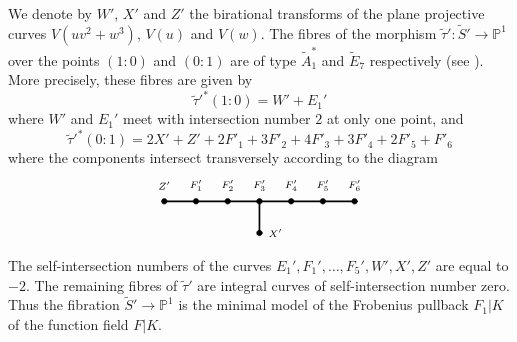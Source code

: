 \documentclass[12pt,reqno]{amsart}
\theoremstyle{definition}
\newcommand{\wt}{\widetilde}
\newcommand{\PP}{\mathbb{P}}
\begin{document}
We denote by $W'$, $X'$ and $Z'$ the birational transforms of the plane projective curves $V(uv^2 + w^3)$, $V(u)$ and $V(w)$.
The fibres of the morphism $\wt \tau' : \wt S' \to \PP^1$ over the points $(1:0)$ and $(0:1)$ are of type $\wt A_1^*$ and $\wt E_7$ respectively (see \cite[Theorem~4.1.4 and Corollary~4.3.22]{CDL23}).
More precisely, these fibres are given by
\[ \wt \tau'^* (1:0) = W' + E_1' \]
where $W'$ and $E_1'$ meet with intersection number $2$ at only one point, and
\[ \wt \tau'^*(0:1) = 2 X' + Z' + 2 F'_1 + 3 F'_2 + 4 F'_3 + 3 F'_4 + 2 F'_5 + F'_6  \]
where the components intersect transversely according to the diagram
\[
\begin{tikzpicture}[line cap=round,line join=round,x=0.8cm,y=0.8cm]
\draw [line width=1.2pt] (-7.,0.)-- (-1.,0.);
\draw [line width=1.2pt] (-4.,0.)-- (-4.,-1.);
\begin{scriptsize}
\draw [fill=black] (-7,0) circle (2pt);
\draw[color=black] (-7,0.5) node {$Z'$};    
\draw [fill=black] (-6,0) circle (2pt);
\draw[color=black] (-6,0.5) node {$F_1'$};
\draw [fill=black] (-5,0) circle (2pt);
\draw[color=black] (-5,0.5) node {$F_2'$};
\draw [fill=black] (-4,0) circle (2pt);
\draw[color=black] (-4,0.5) node {$F_3'$};
\draw [fill=black] (-4,-1.) circle (2pt);
\draw[color=black] (-4.5 + 1,-1) node {$X'$};
\draw [fill=black] (-3,0) circle (2pt);
\draw[color=black] (-3,0.5) node {$F_4'$};
\draw [fill=black] (-2.,0.) circle (2pt);
\draw[color=black] (-2.,.5) node {$F_5'$};
\draw [fill=black] (-1.,0.) circle (2pt);
\draw[color=black] (-1.,.5) node {$F_6'$};
\end{scriptsize}
\end{tikzpicture}
\]
The self-intersection numbers of the curves $E_1',F_1',\dots,F_5',W',X',Z'$ are equal to $-2$.
The remaining fibres of $\wt \tau'$ are integral curves of self-intersection number zero.
Thus the fibration $\wt S' \to \PP^1$ is the minimal model of the Frobenius pullback $F_1|K$ of the function field $F|K$.
\end{document}
